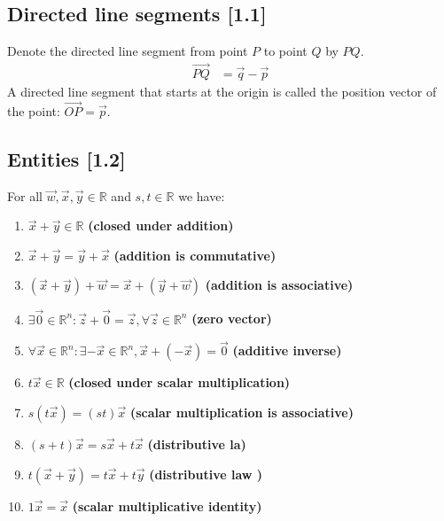 \documentclass[a4paper,9pt]{extarticle}
\begin{document}
\begin{multicols*}{2}

\subsection{Directed line segments [1.1]}
Denote the directed line segment from point $P$ to point $Q$ by $PQ$.
\begin{equation} \label{1.1-3}
    \begin{split}
        \vec{PQ} & = \vec{q} - \vec{p}
    \end{split}
\end{equation}
A directed line segment that starts at the origin is called the position vector of the point: $\vec{OP} = \vec{p}$.


\subsection{Entities [1.2]}
For all $\vec{w}, \vec{x}, \vec{y} \in \mathbb{R}$ and $s,t \in \mathbb{R}$ we have:
\begin{enumerate}[label=\bfseries (\arabic*)] \itemsep0pt \parskip0pt 
    \item $\vec{x} + \vec{y} \in \mathbb{R}$ \textbf{(closed under addition)}
    \item $\vec{x} + \vec{y} = \vec{y} + \vec{x}$ \textbf{(addition is commutative)}
    \item $(\vec{x} + \vec{y}) + \vec{w} = \vec{x} + (\vec{y} + \vec{w})$ \textbf{(addition is associative)}
    \item $\exists \vec{0} \in \mathbb{R}^n: \vec{z} + \vec{0} = \vec{z}, \forall \vec{z} \in \mathbb{R}^n$ \textbf{(zero vector)}
    \item $\forall \vec{x} \in \mathbb{R}^n: \exists -\vec{x} \in \mathbb{R}^n, \vec{x} + (-\vec{x}) = \vec{0}$ \textbf{(additive inverse)}
    \item $t \vec{x} \in \mathbb{R}$ \textbf{(closed under scalar multiplication)}
    \item $s(t \vec{x}) = (st)\vec{x}$ \textbf{(scalar multiplication is associative)}
    \item $(s + t)\vec{x} = s \vec{x} + t \vec{x}$ \textbf{(distributive la)}
    \item $t(\vec{x} + \vec{y}) = t \vec{x} + t \vec{y}$ \textbf{(distributive law )}
    \item $1 \vec{x} = \vec{x}$ \textbf{(scalar multiplicative identity)}
\end{enumerate}


\end{multicols*}
\end{document}
